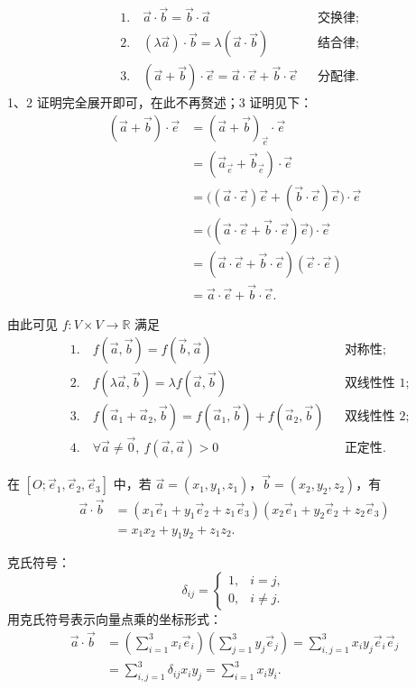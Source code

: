 \documentclass[UTF8,11pt]{ctexart}
\theoremstyle{cnthm}
\begin{document}
\[
\begin{aligned}
&1.\quad \vec a\cdot\vec b=\vec b\cdot\vec a
&&\text{交换律};\\
&2.\quad (\lambda\vec a)\cdot\vec b
=\lambda(\vec a\cdot\vec b) &&\text{结合律};\\
&3.\quad (\vec a+\vec b)\cdot\vec e
=\vec a\cdot\vec e+\vec b\cdot\vec e &&\text{分配律}.
\end{aligned}
\]
1、2 证明完全展开即可，在此不再赘述；3 证明见下：
\[
\begin{aligned}
(\vec a+\vec b)\cdot\vec e
&=(\vec a+\vec b)_{\vec e}\cdot\vec e\\
&=(\vec a_{\vec e}+\vec b_{\vec e})\cdot\vec e\\
&=\bigl((\vec a\cdot\vec e)\vec e
+(\vec b\cdot\vec e)\vec e\bigr)\cdot\vec e\\
&=\bigl((\vec a\cdot\vec e+\vec b\cdot\vec e)\vec e\bigr)\cdot\vec e\\
&=(\vec a\cdot\vec e+\vec b\cdot\vec e)(\vec e\cdot\vec e)\\
&=\vec a\cdot\vec e+\vec b\cdot\vec e .
\end{aligned}
\]

由此可见 $f:V\times V\to\mathbb R$ 满足
\[
\begin{aligned}
&1.\quad f(\vec a,\vec b)=f(\vec b,\vec a)
&&\text{对称性};\\
&2.\quad f(\lambda\vec a,\vec b)=\lambda f(\vec a,\vec b)
&&\text{双线性性 1};\\
&3.\quad f(\vec a_1+\vec a_2,\vec b)
=f(\vec a_1,\vec b)+f(\vec a_2,\vec b)
&&\text{双线性性 2};\\
&4.\quad \forall\vec a\neq\vec 0,\ f(\vec a,\vec a)>0
&&\text{正定性}.
\end{aligned}
\]

在 $[O;\vec e_1,\vec e_2,\vec e_3]$ 中，若
$\vec a=(x_1,y_1,z_1)$，$\vec b=(x_2,y_2,z_2)$，有
\[
\begin{aligned}
\vec a\cdot\vec b
&=(x_1\vec e_1+y_1\vec e_2+z_1\vec e_3)
(x_2\vec e_1+y_2\vec e_2+z_2\vec e_3)\\
&=x_1x_2+y_1y_2+z_1z_2 .
\end{aligned}
\]

克氏符号：
\[
\delta_{ij}=
\begin{cases}
1, & i=j,\\
0, & i\neq j .
\end{cases}
\]
用克氏符号表示向量点乘的坐标形式：
\[
\begin{aligned}
\vec a\cdot\vec b
&=\left(\sum_{i=1}^{3}x_i\vec e_i\right)
\left(\sum_{j=1}^{3}y_j\vec e_j\right)
=\sum_{i,j=1}^{3}x_iy_j\vec e_i\vec e_j\\
&=\sum_{i,j=1}^{3}\delta_{ij}x_iy_j
=\sum_{i=1}^{3}x_iy_i .
\end{aligned}
\]
\end{document}
